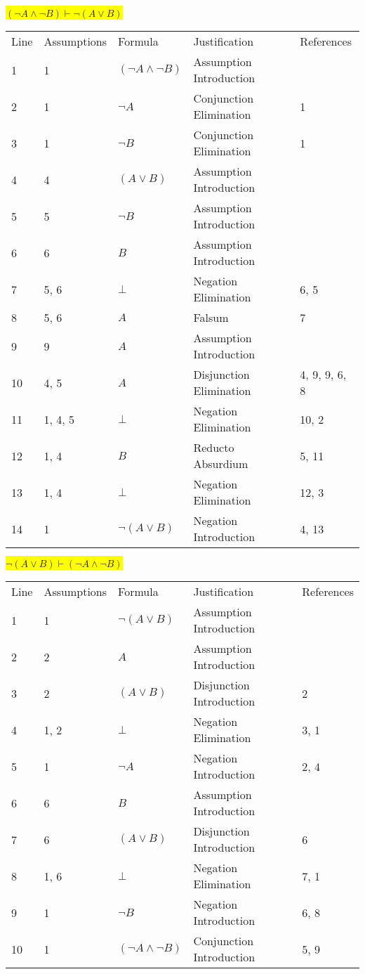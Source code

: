 \documentclass[12pt]{article}
\newcommand{\pr}[1]{\bigbreak \colorbox{Yellow}{$#1$} \smallbreak}
\begin{document}
\begin{flushleft}
\pr{(\neg A\land \neg B) \vdash \neg (A\lor B)}
\begin{tabular}{lllll}
    Line & Assumptions & Formula & Justification & References \\
    1 & 1 & $(\neg A\land \neg B)$  & Assumption Introduction &  \\
    2 & 1 & $\neg A$  & Conjunction Elimination & 1 \\
    3 & 1 & $\neg B$  & Conjunction Elimination & 1 \\
    4 & 4 & $(A\lor B)$  & Assumption Introduction &  \\
    5 & 5 & $\neg B$  & Assumption Introduction &  \\
    6 & 6 & $B$  & Assumption Introduction &  \\
    7 & 5, 6 & $\bot $  & Negation Elimination & 6, 5 \\
    8 & 5, 6 & $A$  & Falsum & 7 \\
    9 & 9 & $A$  & Assumption Introduction &  \\
    10 & 4, 5 & $A$  & Disjunction Elimination & 4, 9, 9, 6, 8 \\
    11 & 1, 4, 5 & $\bot $  & Negation Elimination & 10, 2 \\
    12 & 1, 4 & $B$  & Reducto Absurdium & 5, 11 \\
    13 & 1, 4 & $\bot $  & Negation Elimination & 12, 3 \\
    14 & 1 & $\neg (A\lor B)$  & Negation Introduction & 4, 13 \\
\end{tabular}

\pr{\neg (A\lor B) \vdash (\neg A\land \neg B)}
\begin{tabular}{lllll}
    Line & Assumptions & Formula & Justification & References \\
    1 & 1 & $\neg (A\lor B)$  & Assumption Introduction &  \\
    2 & 2 & $A$  & Assumption Introduction &  \\
    3 & 2 & $(A\lor B)$  & Disjunction Introduction & 2 \\
    4 & 1, 2 & $\bot $  & Negation Elimination & 3, 1 \\
    5 & 1 & $\neg A$  & Negation Introduction & 2, 4 \\
    6 & 6 & $B$  & Assumption Introduction &  \\
    7 & 6 & $(A\lor B)$  & Disjunction Introduction & 6 \\
    8 & 1, 6 & $\bot $  & Negation Elimination & 7, 1 \\
    9 & 1 & $\neg B$  & Negation Introduction & 6, 8 \\
    10 & 1 & $(\neg A\land \neg B)$  & Conjunction Introduction & 5, 9 \\
\end{tabular}


\end{flushleft}
\end{document}
